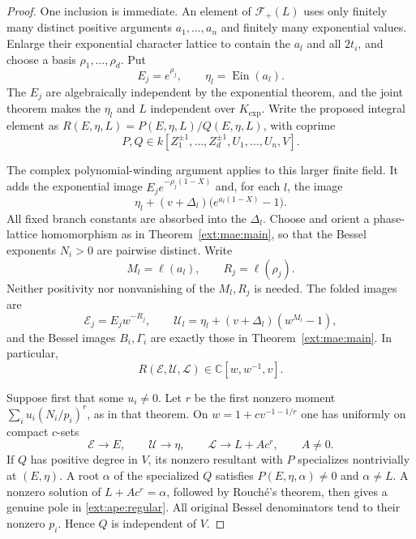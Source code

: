 \documentclass[11pt,a4paper]{article}
\theoremstyle{definition}\newtheorem{definition}[theorem]{Definition}
\theoremstyle{remark}\newtheorem{remark}[theorem]{Remark}
\begin{document}
\begin{proof}
One inclusion is immediate.  An element of $\mathcal F_+(L)$ uses only
finitely many distinct positive arguments $a_1,\ldots,a_n$ and finitely
many exponential values.  Enlarge their exponential character lattice
to contain the $a_l$ and all $2t_i$, and choose a basis
$\rho_1,\ldots,\rho_d$.  Put
\[
                 E_j=e^{\rho_j},\qquad
                 \eta_l=\operatorname{Ein}(a_l).
\]
The $E_j$ are algebraically independent by the exponential theorem,
and the joint theorem makes the $\eta_l$ and $L$ independent over
$K_{\exp}$.  Write the proposed integral element as
$R(E,\eta,L)=P(E,\eta,L)/Q(E,\eta,L)$, with coprime
\[
 P,Q\in k[Z_1^{\pm1},\ldots,Z_d^{\pm1},U_1,\ldots,U_n,V].
\]

The complex polynomial-winding argument applies to this larger finite
field.  It adds the exponential image $E_j e^{-\rho_j(1-X)}$ and, for
each $l$, the image
\[
       \eta_l+(v+\Delta_l)\bigl(e^{a_l(1-X)}-1\bigr).
\]
All fixed branch constants are absorbed into the $\Delta_l$.  Choose
and orient a phase-lattice homomorphism as in Theorem~\ref{ext:mae:main},
so that the Bessel exponents $N_i>0$ are pairwise distinct.  Write
\[
 M_l=\ell(a_l),\qquad R_j=\ell(\rho_j).
\]
Neither positivity nor nonvanishing of the $M_l,R_j$ is needed.  The
folded images are
\[
 \mathcal E_j=E_jw^{-R_j},\qquad
 \mathcal U_l=\eta_l+(v+\Delta_l)(w^{M_l}-1),
\]
and the Bessel images $B_i,\Gamma_i$ are exactly those in
Theorem~\ref{ext:mae:main}.  In particular,
\begin{equation}
             R(\mathcal E,\mathcal U,\mathcal L)
                         \in\mathbb C[w,w^{-1},v].
 \label{ext:ape:regular}
\end{equation}

Suppose first that some $u_i\ne0$.  Let $r$ be the first nonzero
moment $\sum_i u_i(N_i/p_i)^r$, as in that theorem.  On
$w=1+c v^{-1-1/r}$ one has uniformly on compact $c$-sets
\[
 \mathcal E\longrightarrow E,\qquad
 \mathcal U\longrightarrow\eta,\qquad
 \mathcal L\longrightarrow L+A c^r,
 \qquad A\ne0.
\]
If $Q$ has positive degree in $V$, its nonzero resultant with $P$
specializes nontrivially at $(E,\eta)$.  A root $\alpha$ of the
specialized $Q$ satisfies $P(E,\eta,\alpha)\ne0$ and $\alpha\ne L$.
A nonzero solution of $L+Ac^r=\alpha$, followed by Rouch\'e's theorem,
then gives a genuine pole in \eqref{ext:ape:regular}.  All original Bessel
denominators tend to their nonzero $p_i$.  Hence $Q$ is independent
of $V$.


\end{proof}
\end{document}
